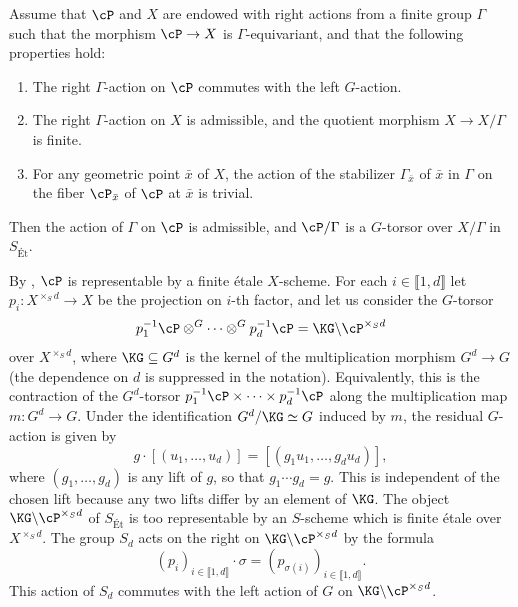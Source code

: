 \begin{prop}
Assume that $\cP$ and $X$ are endowed with right actions from a finite group $\Gamma$ 
such that the morphism $\cP \to X$ is $\Gamma$-equivariant, and that the following properties hold:
\begin{enumerate}
    \item[(a)] The right $\Gamma$-action on $\cP$ commutes with the left $G$-action.
    \item[(b)] The right $\Gamma$-action on $X$ is admissible, and the quotient morphism $X \to X/\Gamma$ is finite.
    \item[(c)] For any geometric point $\bar{x}$ of $X$, the action of the stabilizer $\Gamma_{\bar{x}}$ of $\bar{x}$ in $\Gamma$ on the fiber $\cP_{\bar{x}}$ of $\cP$ at $\bar{x}$ is trivial.
\end{enumerate}
Then the action of $\Gamma$ on $\cP$ is admissible, and $\cP/\Gamma$ is a $G$-torsor over $X/\Gamma$ in $S_{\text{Ét}}$.
\end{prop}

By , $\cP$ is representable by a finite étale $X$-scheme.
For each $i \in  \llbracket 1, d \rrbracket$ let $p_i : X^{\times_S d} \to X$ be the projection on $i$-th factor, and let us consider the $G$-torsor
\[
p_1^{-1}\cP \otimes^G \cdots \otimes^G p_d^{-1}\cP = \KG \backslash \cP^{\times_S d}
\]
over $X^{\times_S d}$, where $\KG \subseteq G^d$ is the kernel of the multiplication morphism $G^d \to G$ (the dependence on $d$ is suppressed in the notation).
Equivalently, this is the contraction of the $G^d$-torsor
$p_1^{-1}\cP\times\cdots\times p_d^{-1}\cP$ along the multiplication map
$m:G^d\to G$.
Under the identification $G^d/\KG\simeq G$ induced by $m$, the residual
$G$-action is given by
\[
g\cdot[(u_1,\dots,u_d)]
    =[(g_1u_1,\dots,g_du_d)],
\]
where $(g_1,\dots,g_d)$ is any lift of $g$, so that
$g_1\cdots g_d=g$. This is independent of the chosen lift because any two
lifts differ by an element of $\KG$.
The object $\KG \backslash \cP^{\times_S d}$ of $S_{\text{Ét}}$ is too representable by an $S$-scheme which is finite étale over $X^{\times_S d}$.
The group ${S}_d$ acts on the right on $\KG \backslash \cP^{\times_S d}$ by the formula
\[
(p_i)_{i \in \llbracket 1, d \rrbracket} \cdot \sigma = (p_{\sigma(i)})_{i \in \llbracket 1, d \rrbracket}.
\]
This action of ${S}_d$ commutes with the left action of $G$ on $\KG \backslash \cP^{\times_S d}$.


